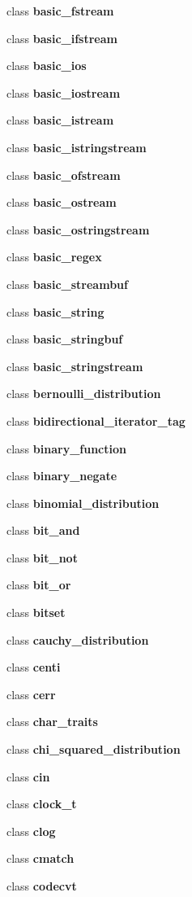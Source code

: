 \begin{DoxyCompactItemize}
class \textbf{ basic\+\_\+fstream}
\item 
class \textbf{ basic\+\_\+ifstream}
\item 
class \textbf{ basic\+\_\+ios}
\item 
class \textbf{ basic\+\_\+iostream}
\item 
class \textbf{ basic\+\_\+istream}
\item 
class \textbf{ basic\+\_\+istringstream}
\item 
class \textbf{ basic\+\_\+ofstream}
\item 
class \textbf{ basic\+\_\+ostream}
\item 
class \textbf{ basic\+\_\+ostringstream}
\item 
class \textbf{ basic\+\_\+regex}
\item 
class \textbf{ basic\+\_\+streambuf}
\item 
class \textbf{ basic\+\_\+string}
\item 
class \textbf{ basic\+\_\+stringbuf}
\item 
class \textbf{ basic\+\_\+stringstream}
\item 
class \textbf{ bernoulli\+\_\+distribution}
\item 
class \textbf{ bidirectional\+\_\+iterator\+\_\+tag}
\item 
class \textbf{ binary\+\_\+function}
\item 
class \textbf{ binary\+\_\+negate}
\item 
class \textbf{ binomial\+\_\+distribution}
\item 
class \textbf{ bit\+\_\+and}
\item 
class \textbf{ bit\+\_\+not}
\item 
class \textbf{ bit\+\_\+or}
\item 
class \textbf{ bitset}
\item 
class \textbf{ cauchy\+\_\+distribution}
\item 
class \textbf{ centi}
\item 
class \textbf{ cerr}
\item 
class \textbf{ char\+\_\+traits}
\item 
class \textbf{ chi\+\_\+squared\+\_\+distribution}
\item 
class \textbf{ cin}
\item 
class \textbf{ clock\+\_\+t}
\item 
class \textbf{ clog}
\item 
class \textbf{ cmatch}
\item 
class \textbf{ codecvt}

\end{DoxyCompactItemize}
